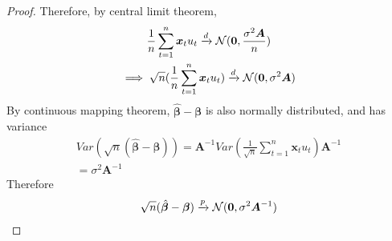 \documentclass[]{article}
\begin{document}
\begin{proof}
				Therefore, by central limit theorem,
				\begin{gather}
					\frac{1}{n} \sum_{t=1}^n \bm{x}_t u_t \xrightarrow{d} \mathcal{{N}}(\bm{0}, \frac{\sigma^2 \bm{A}}{n}) \\
					\implies \sqrt{n} (\frac{1}{n} \sum_{t=1}^n \bm{x}_t u_t) \xrightarrow{d} \mathcal{{N}}(\bm{0}, \sigma^2 \bm{A})
				\end{gather}
				By continuous mapping theorem, $\hat{\bm{\beta}} - \bm{\beta}$ is also normally distributed, and has variance
				\begin{gather}
					Var(\sqrt{n} (\hat{\bm{\beta}} - \bm{\beta})) = \bm{A}^{-1} Var(\frac{1}{\sqrt{n}} \sum_{t=1}^n \bm{x}_t u_t) \bm{A}^{-1} \\
					= \sigma^2 \bm{A}^{-1}
				\end{gather}
				Therefore
				\begin{gather}
					\sqrt{n}(\hat{\bm{\beta}} - \bm{\beta}) \xrightarrow{p} \mathcal{{N}}(\bm{0}, \sigma^2 \bm{A}^{-1})
				\end{gather}
			\end{proof}
\end{document}
